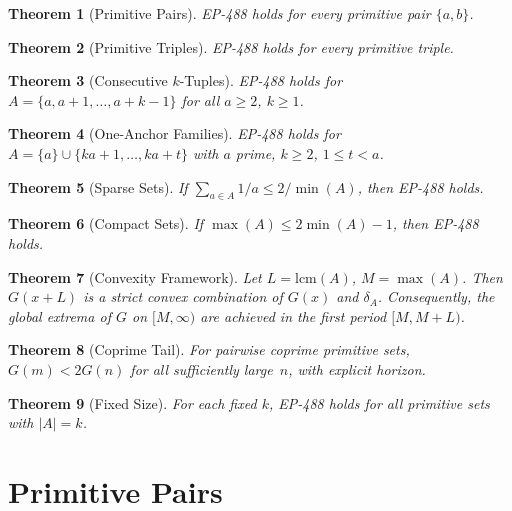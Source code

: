 \documentclass[11pt,a4paper]{article}
\newtheorem{theorem}{Theorem}[section]
\theoremstyle{definition}
\begin{document}
\begin{theorem}[Primitive Pairs]\label{thm:pairs}
EP-488 holds for every primitive pair $\{a,b\}$.
\end{theorem}

\begin{theorem}[Primitive Triples]\label{thm:triples}
EP-488 holds for every primitive triple.
\end{theorem}

\begin{theorem}[Consecutive $k$-Tuples]\label{thm:consec}
EP-488 holds for $A = \{a, a{+}1, \ldots, a{+}k{-}1\}$ for all
$a \geq 2$, $k \geq 1$.
\end{theorem}

\begin{theorem}[One-Anchor Families]\label{thm:anchor}
EP-488 holds for $A = \{a\} \cup \{ka{+}1, \ldots, ka{+}t\}$ with
$a$ prime, $k \geq 2$, $1 \leq t < a$.
\end{theorem}

\begin{theorem}[Sparse Sets]\label{thm:sparse}
If $\sum_{a \in A} 1/a \leq 2/\min(A)$, then EP-488 holds.
\end{theorem}

\begin{theorem}[Compact Sets]\label{thm:compact}
If $\max(A) \leq 2\min(A) - 1$, then EP-488 holds.
\end{theorem}

\begin{theorem}[Convexity Framework]\label{thm:convexity}
Let $L = \mathrm{lcm}(A)$, $M = \max(A)$. Then $G(x{+}L)$ is a strict
convex combination of $G(x)$ and $\delta_A$. Consequently, the global
extrema of $G$ on $[M, \infty)$ are achieved in the first period
$[M, M{+}L)$.
\end{theorem}

\begin{theorem}[Coprime Tail]\label{thm:coprime-tail}
For pairwise coprime primitive sets, $G(m) < 2G(n)$ for all
sufficiently large~$n$, with explicit horizon.
\end{theorem}

\begin{theorem}[Fixed Size]\label{thm:fixed-k}
For each fixed $k$, EP-488 holds for all primitive sets with $|A| = k$.
\end{theorem}

\section{Primitive Pairs}
\end{document}
